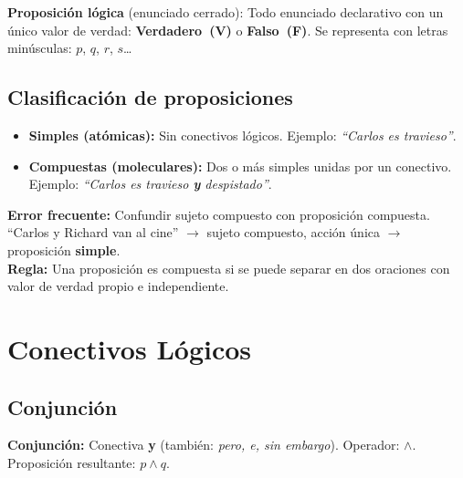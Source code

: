 	\begin{cajadef}[2]
		\textbf{Proposición lógica} (enunciado cerrado): Todo enunciado declarativo
		con un único valor de verdad: \textbf{Verdadero~(V)} o \textbf{Falso~(F)}.
		Se representa con letras minúsculas: $p$, $q$, $r$, $s$\ldots
	\end{cajadef}
	
	\subsection{Clasificación de proposiciones}
	
	\begin{cajaprop}[Tipos]
		\begin{itemize}
			\item \textbf{Simples (atómicas):} Sin conectivos lógicos.
			Ejemplo: \textit{``Carlos es travieso''}.
			\item \textbf{Compuestas (moleculares):} Dos o más simples unidas por un
			conectivo. Ejemplo: \textit{``Carlos es travieso \textbf{y} despistado''}.
		\end{itemize}
	\end{cajaprop}
	
	\begin{cajaadvert}
		\textbf{Error frecuente:} Confundir sujeto compuesto con proposición compuesta.\\
		``Carlos y Richard van al cine'' $\to$ sujeto compuesto, acción única $\to$
		proposición \textbf{simple}.\\[4pt]
		\textbf{Regla:} Una proposición es compuesta si se puede separar en dos oraciones
		con valor de verdad propio e independiente.
	\end{cajaadvert}
	
	\section{Conectivos Lógicos}
	
	\subsection{Conjunción }
	
	\begin{cajadef}
		\textbf{Conjunción:} Conectiva \textbf{y} (también: \textit{pero, e, sin
			embargo}). Operador: $\wedge$. Proposición resultante: $p \wedge q$.
	\end{cajadef}
	
